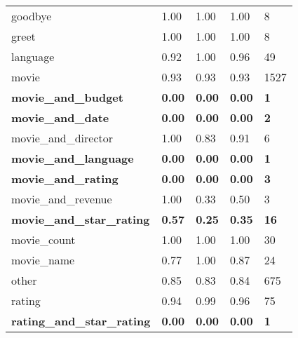\documentclass[11pt,a4paper]{article}
\begin{document}
\begin{table*}[ht]
\begin{tabular}{|l|llll|}
goodbye                                                     & 1.00          & 1.00          & 1.00          & 8           \\
greet                                                       & 1.00          & 1.00          & 1.00          & 8           \\
language                                                    & 0.92          & 1.00          & 0.96          & 49          \\
movie                                                       & 0.93          & 0.93          & 0.93          & 1527        \\
\textbf{movie\_and\_budget}                                 & \textbf{0.00} & \textbf{0.00} & \textbf{0.00} & \textbf{1}  \\
\textbf{movie\_and\_date}                                   & \textbf{0.00} & \textbf{0.00} & \textbf{0.00} & \textbf{2}  \\
movie\_and\_director                                        & 1.00          & 0.83          & 0.91          & 6           \\
\textbf{movie\_and\_language}                               & \textbf{0.00} & \textbf{0.00} & \textbf{0.00} & \textbf{1}  \\
\textbf{movie\_and\_rating}                                 & \textbf{0.00} & \textbf{0.00} & \textbf{0.00} & \textbf{3}  \\
movie\_and\_revenue                                         & 1.00          & 0.33          & 0.50          & 3           \\
\textbf{movie\_and\_star\_rating}                           & \textbf{0.57} & \textbf{0.25} & \textbf{0.35} & \textbf{16} \\
movie\_count                                                & 1.00          & 1.00          & 1.00          & 30          \\
movie\_name                                                 & 0.77          & 1.00          & 0.87          & 24          \\
other                                                       & 0.85          & 0.83          & 0.84          & 675         \\
rating                                                      & 0.94          & 0.99          & 0.96          & 75          \\
\textbf{rating\_and\_star\_rating}                          & \textbf{0.00} & \textbf{0.00} & \textbf{0.00} & \textbf{1}  \\

\end{tabular}
\end{table*}
\end{document}
